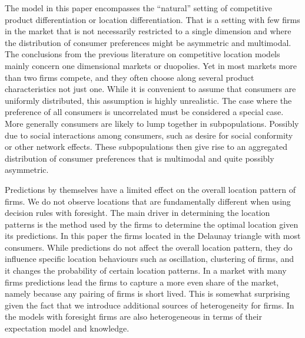 \documentclass[preprint, 12pt]{elsarticle}
\begin{document}
The model in this paper encompasses the ``natural'' setting of competitive product differentiation or location differentiation. That is a setting with few firms in the market that is not necessarily restricted to a single dimension and where the distribution of consumer preferences might be asymmetric and multimodal. The conclusions from the previous literature on competitive location models mainly concern one dimensional markets or duopolies. Yet in most markets more than two firms compete, and they often choose along several product characteristics not just one. While it is convenient to assume that consumers are uniformly distributed, this assumption is highly unrealistic. The case where the preference of all consumers is uncorrelated must be considered a special case. More generally consumers are likely to lump together in subpopulations. Possibly due to social interactions among consumers, such as desire for social conformity or other network effects. These subpopulations then give rise to an aggregated distribution of consumer preferences that is multimodal and quite possibly asymmetric.

Predictions by themselves have a limited effect on the overall location pattern of firms. We do not observe locations that are fundamentally different when using decision rules with foresight. The main driver in determining the location patterns is the method used by the firms to determine the optimal location given its predictions. In this paper the firms located in the Delaunay triangle with most consumers. While predictions do not affect the overall location pattern, they do influence specific location behaviours such as oscillation, clustering of firms, and it changes the probability of certain location patterns. In a market with many firms predictions lead the firms to capture a more even share of the market, namely because any pairing of firms is short lived. This is somewhat surprising given the fact that we introduce additional sources of heterogeneity for firms. In the models with foresight firms are also heterogeneous in terms of their expectation model and knowledge.
\end{document}

